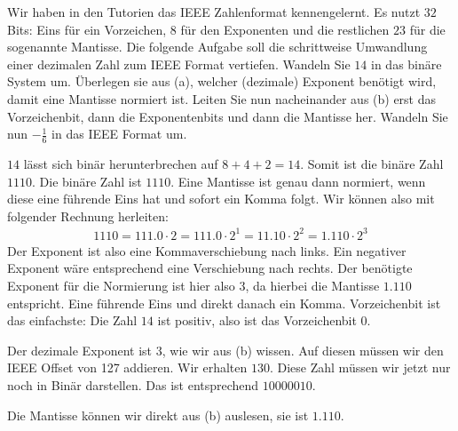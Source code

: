 \documentclass{scrartcl}
\newcommand{\num}{01}
\newcommand{\topic}{Zahlendarstellung}
\begin{document}
	\HAtitle{\num}{\topic}
	\newpage
	{
		Wir haben in den Tutorien das IEEE Zahlenformat kennengelernt. Es nutzt $32$ Bits: Eins für ein Vorzeichen, $8$ für den Exponenten und die restlichen $23$ für die sogenannte Mantisse. Die folgende Aufgabe soll die schrittweise Umwandlung einer dezimalen Zahl zum IEEE Format vertiefen.
	}{
		\itemf Wandeln Sie $14$ in das binäre System um.
		\itemf Überlegen sie aus (a), welcher (dezimale) Exponent benötigt wird, damit eine Mantisse normiert ist.
		\itemf Leiten Sie nun nacheinander aus (b) erst das Vorzeichenbit, dann die Exponentenbits und dann die Mantisse her.
		\itemf Wandeln Sie nun $-\frac{1}{6}$ in das IEEE Format um.
	}{
		\itemf $14$ lässt sich binär herunterbrechen auf $8 + 4 + 2 = 14$. Somit ist die binäre Zahl $1110$.
		\itemf Die binäre Zahl ist $1110$. Eine Mantisse ist genau dann normiert, wenn diese eine führende Eins hat und sofort ein Komma folgt. Wir können also mit folgender Rechnung herleiten:
		\begin{align*}
			1110 = 111.0 \cdot 2 = 111.0 \cdot 2^1 = 11.10 \cdot 2^2 = 1.110 \cdot 2^3
		\end{align*}
		Der Exponent ist also eine Kommaverschiebung nach links. Ein negativer Exponent wäre entsprechend eine Verschiebung nach rechts. Der benötigte Exponent für die Normierung ist hier also $3$, da hierbei die Mantisse $1.110$ entspricht. Eine führende Eins und direkt danach ein Komma.
		\itemf Vorzeichenbit ist das einfachste: Die Zahl $14$ ist positiv, also ist das Vorzeichenbit $0$. 
		
		Der dezimale Exponent ist $3$, wie wir aus (b) wissen. Auf diesen müssen wir den IEEE Offset von 127 addieren. Wir erhalten $130$. Diese Zahl müssen wir jetzt nur noch in Binär darstellen. Das ist entsprechend $10000010$.
		
		Die Mantisse können wir direkt aus (b) auslesen, sie ist $1.110$.
		
}
\end{document}
